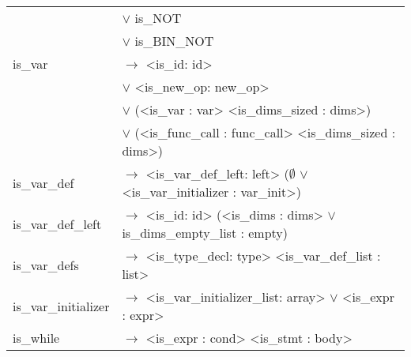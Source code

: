 \documentclass[a4paper]{article}
\begin{document}
\begin{tabular}{ll}
											& $\vee$ is\_NOT \\
											& $\vee$ is\_BIN\_NOT \\
	is\_var					 				& $\to$ <is\_id: id> \\
											& $\vee$ <is\_new\_op: new\_op> \\
											& $\vee$ (<is\_var : var> <is\_dims\_sized : dims>) \\
											& $\vee$ (<is\_func\_call : func\_call> <is\_dims\_sized : dims>) \\
	is\_var\_def			 				& $\to$ <is\_var\_def\_left: left> ($\emptyset$ $\vee$ <is\_var\_initializer : var\_init>) \\
	is\_var\_def\_left		 				& $\to$ <is\_id: id> (<is\_dims : dims> $\vee$ is\_dims\_empty\_list : empty) \\
	is\_var\_defs		 					& $\to$ <is\_type\_decl: type> <is\_var\_def\_list : list> \\
	is\_var\_initializer 					& $\to$ <is\_var\_initializer\_list: array> $\vee$ <is\_expr : expr> \\
	is\_while 								& $\to$ <is\_expr : cond> <is\_stmt : body> \\
\end{tabular}
\end{document}
